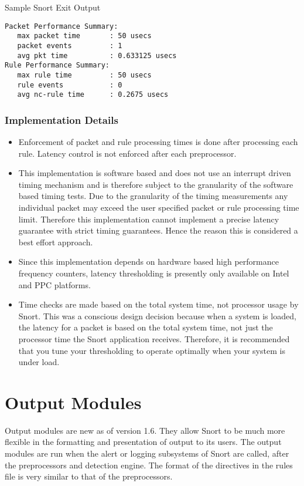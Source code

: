 \documentclass[english]{report}
\begin{document}
Sample Snort Exit Output
\begin{verbatim}
Packet Performance Summary:
   max packet time       : 50 usecs
   packet events         : 1
   avg pkt time          : 0.633125 usecs
Rule Performance Summary:
   max rule time         : 50 usecs
   rule events           : 0
   avg nc-rule time      : 0.2675 usecs
\end{verbatim}

\subsubsection{Implementation Details}
\begin{itemize}
\item Enforcement of packet and rule processing times is done after
processing each rule.  Latency control is not enforced after each
preprocessor.  

\item This implementation is software based and does not use an interrupt
driven timing mechanism and is therefore subject to the granularity of the
software based timing tests. Due to the granularity of the timing
measurements any individual packet may exceed the user specified packet or
rule processing time limit.  Therefore this implementation cannot implement
a precise latency guarantee with strict timing guarantees.  Hence the
reason this is considered a best effort approach.

\item Since this implementation depends on hardware based high performance
frequency counters, latency thresholding is presently only available on
Intel and PPC platforms. 

\item Time checks are made based on the total system time, not processor
usage by Snort.  This was a conscious design decision because when a system
is loaded, the latency for a packet is based on the total system time, not
just the processor time the Snort application receives.  Therefore, it is
recommended that you tune your thresholding to operate optimally when your
system is under load.
\end{itemize}


\section{Output Modules \label{output config}}

Output modules are new as of version 1.6. They allow Snort to be much
more flexible in the formatting and presentation of output to its
users. The output modules are run when the alert or logging subsystems
of Snort are called, after the preprocessors and detection engine.
The format of the directives in the rules file is very similar to
that of the preprocessors.
\end{document}
